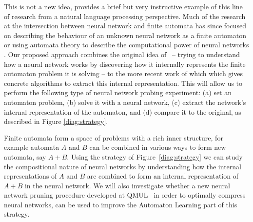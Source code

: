 \documentclass[10pt,a4paper]{article}
\begin{document}
		
		This is not a new idea, \cite{cleeremans1989finite} provides a brief but very instructive example of this line of research from a natural language processing perspective. Much of the research at the intersection between neural network and finite automata has since focused on describing the behaviour of an unknown neural network as a finite automaton \cite{weiss2018extracting,weiss2019learning} or using automata theory to describe the computational power of neural networks \cite{weiss2018practical}. Our proposed approach combines the original idea of~\cite{cleeremans1989finite} -- trying to understand how a neural network works by discovering how it internally represents the finite automaton problem it is solving -- to the more recent work of \cite{weiss2018extracting,weiss2019learning} which which gives concrete algorithms to extract this internal representation. This will allow us to perform the following type of neural network probing experiment: (a) set an automaton problem, (b) solve it with a neural network, (c) extract the network's internal representation of the automaton, and (d) compare it to the original, as described in Figure \ref{diag:strategy}. 
		
		Finite automata form a space of problems with a rich inner structure, for example automata $A$ and $B$ can be combined in various ways to form new automata, say $A+B$. Using the strategy of Figure~\ref{diag:strategy} we can study the compositional nature of neural networks by understanding how the internal representations of $A$ and $B$ are combined to form an internal representation of $A+B$ in the neural network. We will also investigate whether a new neural network pruning procedure developed at QMUL~\cite{pruning} in order to optimally compress neural networks, can be used to improve the Automaton Learning part of this strategy.	
		
\end{document}
